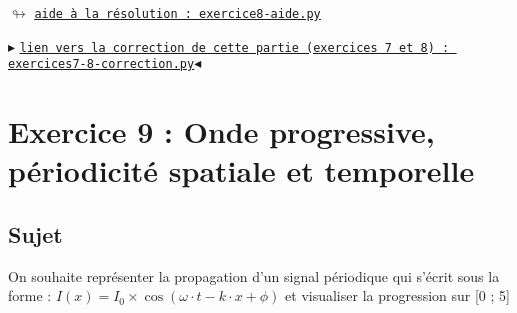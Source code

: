 \documentclass[11pt]{article}
\begin{document}
\begin{center}
 $\looparrowright$ \href{https://github.com/formationPythonPC-Juin/aides-formation/blob/master/exercice8-aide.py}{\underline{\texttt{aide à la résolution : exercice8-aide.py}}}
\end{center}



\bigskip
\begin{center}
$\blacktriangleright$ \href{https://github.com/formationPythonPC-Juin/corrections-formation/blob/master/exercices7-8-correction.py}{\underline{\texttt{lien vers la correction de cette partie (exercices 7 et 8) : exercices7-8-correction.py}}}$\blacktriangleleft$                                                                                                                                                                    \end{center}






\newpage



\section{Exercice 9 : Onde progressive, périodicité spatiale et temporelle}






\bigskip


\subsection{Sujet}


On souhaite représenter la propagation d'un signal périodique qui s'écrit sous la forme : $I(x) = I_0\times \cos (\omega\cdot t - k\cdot x + \phi )$ et visualiser la progression sur [0 ; 5]
\end{document}
